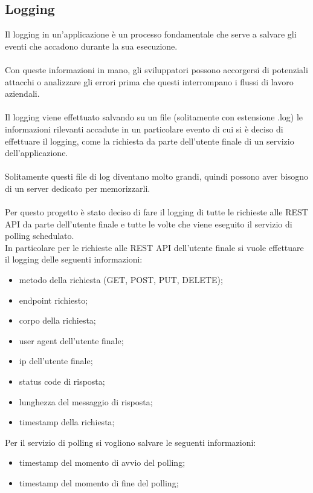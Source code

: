 \subsection{Logging}
Il logging in un'applicazione è un processo fondamentale che serve a salvare gli eventi che accadono durante
la sua esecuzione.
\\\\
Con queste informazioni in mano, gli sviluppatori possono accorgersi di potenziali attacchi o analizzare gli
errori prima che questi interrompano i flussi di lavoro aziendali.
\\\\
Il logging viene effettuato salvando su un file (solitamente con estensione .log) le informazioni rilevanti
accadute in un particolare evento di cui si è deciso di effettuare il logging, come la richiesta da parte
dell'utente finale di un servizio dell'applicazione.
\\\\
Solitamente questi file di log diventano molto grandi, quindi possono aver bisogno di un server dedicato per 
memorizzarli.
\\\\
Per questo progetto è stato deciso di fare il logging di tutte le richieste alle REST API da parte dell'utente
finale e tutte le volte che viene eseguito il servizio di polling schedulato.
\\
In particolare per le richieste alle REST API dell'utente finale si vuole effettuare il logging delle seguenti 
informazioni:
\begin{itemize}
    \item metodo della richiesta (GET, POST, PUT, DELETE);
    \item endpoint richiesto;
    \item corpo della richiesta;
    \item user agent dell'utente finale;
    \item ip dell'utente finale;
    \item status code di risposta;
    \item lunghezza del messaggio di risposta;
    \item timestamp della richiesta;
\end{itemize}
\leavevmode\newline
Per il servizio di polling si vogliono salvare le seguenti informazioni:
\begin{itemize}
    \item timestamp del momento di avvio del polling;
    \item timestamp del momento di fine del polling;
\end{itemize}
\leavevmode\newline

